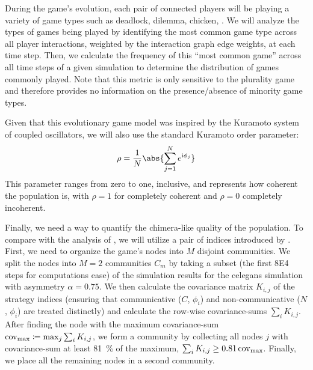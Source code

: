 \documentclass[pdflatex,lineno,referee,sn-mathphys-ay]{sn-jnl}
\begin{document}
During the game's evolution,
each pair of connected players will be playing a variety of game types
such as deadlock, dilemma, chicken, \etc{}
\citep[\cf{}][for definitions]{bruns2015names}.
We will analyze the types of games being played by
identifying the most common game type across all player interactions,
weighted by the interaction graph edge weights,
at each time step.
Then, we calculate the frequency of this ``most common game'' across
all time steps of a given simulation to determine the distribution
of games commonly played.
Note that this metric is only sensitive to the
plurality game and therefore provides no information
on the presence/absence of minority game types.

Given that this evolutionary game model was inspired
by the Kuramoto system of coupled oscillators,
we will also use the standard Kuramoto order parameter:
\begin{equation}
  \rho = \frac{1}{N} \abs{\sum_{j=1}^N e^{\im \phi_j}}
  \label{eq:order_parameter}
\end{equation}
This parameter ranges from zero to one, inclusive,
and represents how coherent the population is,
with $\rho = 1$ for completely coherent and $\rho = 0$ completely incoherent.

Finally, we need a way to quantify
the chimera-like quality of the population.
To compare with the analysis of \citet{hizanidis2016chimera},
we will utilize a pair of indices introduced
by \citet{shanahan2010metastable}.
First, we need to organize the game's nodes
into $M$ disjoint communities.
We split the nodes into $M=2$ communities $C_m$
by taking a subset
(the first \num{8E4} steps for computations ease)
of the simulation results
for the \gls{celegans} simulation with asymmetry $\alpha = \num{0.75}$.
We then calculate the covariance matrix $K_{i,j}$ of the strategy indices
(ensuring that communicative ($C$, $\phi_i$)
and non-communicative ($N$, $\phi_i$) are treated distinctly)
and calculate the row-wise covariance-sums  $\sum_i K_{i,j}$.
After finding the node with the maximum covariance-sum
$\operatorname{cov}_{\text{max}} \coloneqq \max_j{\sum_i K_{i,j}}$,
we form a community by collecting all nodes $j$ with covariance-sum
at least \SI{81}{\percent} of the maximum,
$\sum_i K_{i,j} \ge \num{0.81} \operatorname{cov}_{\text{max}}$.
Finally, we place all the remaining nodes in a second community.
\end{document}
